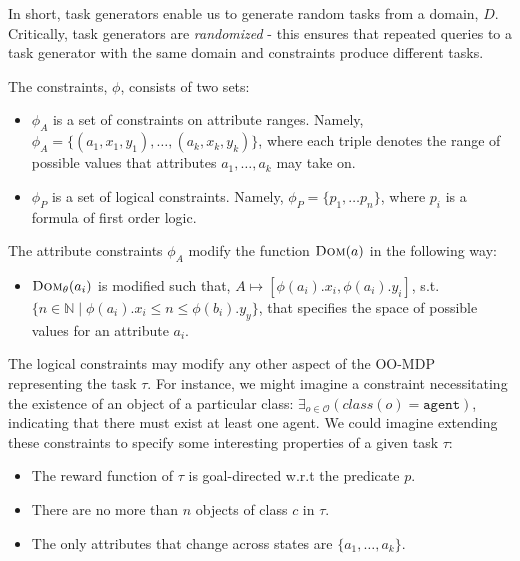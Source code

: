 \documentclass[11pt]{article}
\begin{document}
In short, task generators enable us to generate random tasks from a domain, $D$. Critically, task generators are {\it randomized} - this ensures that repeated queries to a task generator with the same domain and constraints produce different tasks.

The constraints, $\phi$, consists of two sets:

\begin{itemize}
\item $\phi_{A}$ is a set of constraints on attribute ranges. Namely, $\phi_{A} = \{ (a_1, x_1, y_1), \ldots, (a_k, x_k, y_k) \}$, where each triple denotes the range of possible values that attributes $a_1, \ldots, a_k$ may take on.
\item $\phi_{P}$ is a set of logical constraints. Namely, $\phi_P = \{p_1, \ldots p_n\}$, where $p_i$ is a formula of first order logic.
\end{itemize}

The attribute constraints $\phi_A$ modify the function $\textsc{Dom}(a)$ in the following way:

\begin{itemize}
\item $\textsc{Dom}_\theta(a_i)$ is modified such that, $A \mapsto [\phi(a_i).x_i,\phi(a_i).y_i]$, s.t. $\{n \in \mathbb{N} \mid \phi(a_i).x_i \leq n \leq \phi(b_i).y_y \}$, that specifies the space of possible values for an attribute $a_i$.
\end{itemize}

The logical constraints may modify any other aspect of the OO-MDP representing the task $\tau$. For instance, we might imagine a constraint necessitating the existence of an object of a particular class: $\exists_{o \in \mathcal{O}} \left(class(o) = \texttt{agent}\right)$, indicating that there must exist at least one agent. We could imagine extending these constraints to specify some interesting properties of a given task $\tau$:

\begin{itemize}
\item The reward function of $\tau$ is goal-directed w.r.t the predicate $p$.
\item There are no more than $n$ objects of class $c$ in $\tau$.
\item The only attributes that change across states are $\{a_1, \ldots, a_k\}$.
\end{itemize}

\end{document}

